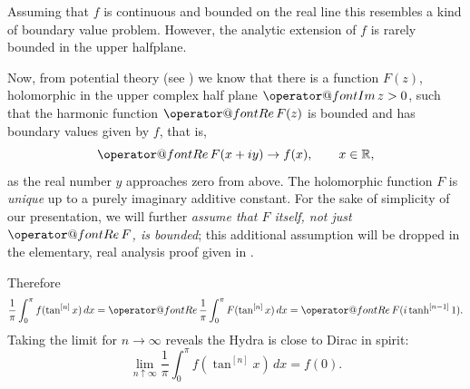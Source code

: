 \documentclass{amsart}
\makeatletter
\theoremstyle{plain}
\numberwithin{equation}{section}
\newcommand{\R}{{\mathbb  R}}
\renewcommand{\Re}{{\operator@font Re\,}}
\renewcommand{\Im}{{\operator@font Im\,}}
\makeatother
\begin{document}
Assuming that $f$ is continuous and bounded on the real line this resembles a kind of boundary value problem. However, the analytic extension of $f$ is rarely bounded in the upper halfplane.

Now, from potential theory (see \cite[Thms. 15.1a, 15.4d]{Hen}) we know that there is a function $F(z)$, holomorphic
in the upper complex half plane $\Im z >0$, such that the harmonic function $\Re F(z)$ is bounded and has boundary values given by $f$, that is,
\begin{equation}\label{eq.F}
\Re F(x+ i y) \to f(x), \qquad x\in\R,
\end{equation}
as the real number $y$ approaches zero from above. The holomorphic function $F$ is \emph{unique}
up to a purely imaginary additive constant. For the sake of simplicity of our presentation, we will further
{\em assume that $F$ itself, not just $\Re F$, is bounded}\/; this additional assumption will be dropped
in the elementary, real analysis proof given in \cite{BornemannSchmelzer}.

Therefore
\[
\frac{1}{\pi}\int_0^\pi f(\tan^{[n]}x)\,dx = \Re \frac{1}{\pi} \int_0^\pi F(\tan^{[n]}x)\,dx = \Re F(i \tanh^{[n-1]}1).
\]
Taking the limit for $n \to \infty$ reveals the Hydra is close to Dirac in spirit:
\[
\lim_{n \uparrow \infty} \frac{1}{\pi}\int_0^\pi f(\tan^{[n]}x)\,dx = f(0).
\]




\end{document}
